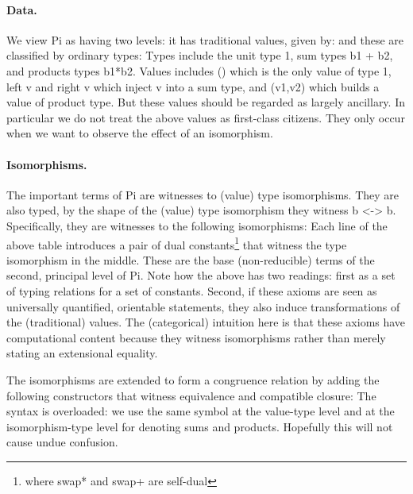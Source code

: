 \documentclass{llncs}
\begin{document}
\paragraph*{Data.}
We view {{Pi}} as having two levels:  it has traditional values, given by:
\noindent and these are classified by ordinary types:
\noindent Types include the unit type {{1}}, sum types {{b1 + b2}}, and
products types {{b1*b2}}.  Values includes {{()}} which is the only value of
type {{1}}, {{left v}} and {{right v}} which inject {{v}} into a sum type,
and {{(v1,v2)}} which builds a value of product type. But these values should
be regarded as largely ancillary.  In particular we do not treat the above
values as first-class citizens.  They only occur when we want to observe the
effect of an isomorphism.

\paragraph*{Isomorphisms.} The important terms of {{Pi}} are witnesses to
(value) type isomorphisms.  They are also typed, by the shape of the (value)
type isomorphism they witness {{b <-> b}}.  Specifically, they are witnesses to
the following isomorphisms:
\noindent Each line of the above table introduces a pair of dual
constants\footnote{where {{swap*}} and {{swap+}} are self-dual} that witness
the type isomorphism in the middle.  These are the base (non-reducible) terms
of the second, principal level of {{Pi}}. Note how the above has two
readings: first as a set of typing relations for a set of constants. Second,
if these axioms are seen as universally quantified, orientable statements,
they also induce transformations of the (traditional) values. The
(categorical) intuition here is that these axioms have computational content
because they witness isomorphisms rather than merely stating an extensional
equality.

The isomorphisms are extended to form a congruence relation by adding the
following constructors that witness equivalence and compatible closure:
%
%
%
\noindent The syntax is overloaded: we use the same symbol at the value-type level
and at the isomorphism-type level for denoting sums and products.  Hopefully
this will not cause undue confusion.
\end{document}

